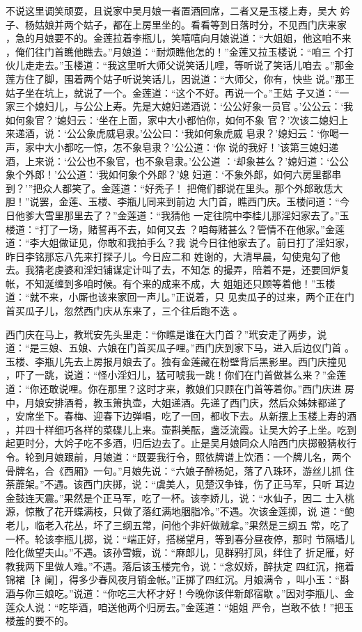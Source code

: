 不说这里调笑顽耍，且说家中吴月娘一者置酒回席，二者又是玉楼上寿，吴大
妗子、杨姑娘并两个姑子，都在上房里坐的。看看等到日落时分，不见西门庆来家
，急的月娘要不的。金莲拉着李瓶儿，笑嘻嘻向月娘说道：“大姐姐，他这咱不来
，俺们往门首瞧他瞧去。”月娘道：“耐烦瞧他怎的！”金莲又拉玉楼说：“咱三
个打伙儿走走去。”玉楼道：“我这里听大师父说笑话儿哩，等听说了笑话儿咱去
。”那金莲方住了脚，围着两个姑子听说笑话儿，因说道：“大师父，你有，快些
说。”那王姑子坐在坑上，就说了一个。金莲道：“这个不好。再说一个。”王姑
子又道：“一家三个媳妇儿，与公公上寿。先是大媳妇递酒说：‘公公好象一员官
。’公公云：‘我如何象官？’媳妇云：‘坐在上面，家中大小都怕你，如何不象
官？’次该二媳妇上来递酒，说：‘公公象虎威皂隶。’公公曰：‘我如何象虎威
皂隶？’媳妇云：‘你喝一声，家中大小都吃一惊，怎不象皂隶？’公公道：‘你
说的我好！’该第三媳妇递酒，上来说：‘公公也不象官，也不象皂隶。’公公道
：‘却象甚么？’媳妇道：‘公公象个外郎！’公公道：‘我如何象个外郎？’媳
妇道：‘不象外郎，如何六房里都串到？’”把众人都笑了。金莲道：“好秃子！
把俺们都说在里头。那个外郎敢恁大胆！”说罢，金莲、玉楼、李瓶儿同来到前边
大门首，瞧西门庆。玉楼问道：“今日他爹大雪里那里去了？”金莲道：“我猜他
一定往院中李桂儿那淫妇家去了。”玉楼道：“打了一场，赌誓再不去，如何又去
？咱每赌甚么？管情不在他家。”金莲道：“李大姐做证见，你敢和我拍手么？我
说今日往他家去了。前日打了淫妇家，昨日李铭那忘八先来打探子儿。今日应二和
姓谢的，大清早晨，勾使鬼勾了他去。我猜老虔婆和淫妇铺谋定计叫了去，不知怎
的撮弄，陪着不是，还要回炉复帐，不知涎缠到多咱时候。有个来的成来不成，大
姐姐还只顾等着他！”玉楼道：“就不来，小厮也该来家回一声儿。”正说着，只
见卖瓜子的过来，两个正在门首买瓜子儿，忽然西门庆从东来了，三个往后跑不迭
。

西门庆在马上，教玳安先头里走：“你瞧是谁在大门首？”玳安走了两步，说
道：“是三娘、五娘、六娘在门首买瓜子哩。”西门庆到家下马，进入后边仪门首
。玉楼、李瓶儿先去上房报月娘去了。独有金莲藏在粉壁背后黑影里。西门庆撞见
，吓了一跳，说道：“怪小淫妇儿，猛可唬我一跳！你们在门首做甚么来？”金莲
道：“你还敢说哩。你在那里？这时才来，教娘们只顾在门首等着你。”西门庆进
房中，月娘安排酒肴，教玉箫执壶，大姐递酒。先递了西门庆，然后众姊妹都递了
，安席坐下。春梅、迎春下边弹唱，吃了一回，都收下去。从新摆上玉楼上寿的酒
，并四十样细巧各样的菜碟儿上来。壶斟美酝，盏泛流霞。让吴大妗子上坐。吃到
起更时分，大妗子吃不多酒，归后边去了。止是吴月娘同众人陪西门庆掷骰猜枚行
令。轮到月娘跟前，月娘道：“既要我行令，照依牌谱上饮酒：一个牌儿名，两个
骨牌名，合《西厢》一句。”月娘先说：“六娘子醉杨妃，落了八珠环，游丝儿抓
住荼蘼架。”不遇。该西门庆掷，说：“虞美人，见楚汉争锋，伤了正马军，只听
耳边金鼓连天震。”果然是个正马军，吃了一杯。该李娇儿，说：“水仙子，因二
士入桃源，惊散了花开蝶满枝，只做了落红满地胭脂冷。”不遇。次该金莲掷，说
道：“鲍老儿，临老入花丛，坏了三纲五常，问他个非奸做贼拿。”果然是三纲五
常，吃了一杯。轮该李瓶儿掷，说：“端正好，搭梯望月，等到春分昼夜停，那时
节隔墙儿险化做望夫山。”不遇。该孙雪娥，说：“麻郎儿，见群鸦打凤，绊住了
折足雁，好教我两下里做人难。”不遇。落后该玉楼完令，说：“念奴娇，醉扶定
四红沉，拖着锦裙［衤阑］，得多少春风夜月销金帐。”正掷了四红沉。月娘满令
，叫小玉：“斟酒与你三娘吃。”说道：“你吃三大杯才好！今晚你该伴新郎宿歇
。”因对李瓶儿、金莲众人说：“吃毕酒，咱送他两个归房去。”金莲道：“姐姐
严令，岂敢不依！”把玉楼羞的要不的。

